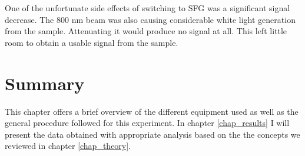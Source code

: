 One of the unfortunate side effects of switching to SFG was a significant signal decrease. The 800 nm beam was also causing considerable white light generation from the sample. Attenuating it would produce no signal at all. This left little room to obtain a usable signal from the sample.

\section{Summary}
This chapter offers a brief overview of the different equipment used as well as the general procedure followed for this experiment. In chapter \ref{chap_results} I will present the data obtained with appropriate analysis based on the the concepts we reviewed in chapter \ref{chap_theory}.
